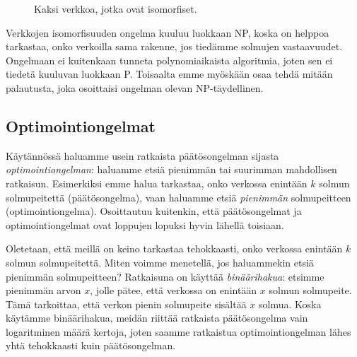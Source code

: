 \begin{figure}
\center
\begin{center}
\end{center}
\caption{Kaksi verkkoa, jotka ovat isomorfiset.}
\label{fig:veriso}
\end{figure}


Verkkojen isomorfisuuden ongelma kuuluu luokkaan NP,
koska on helppoa tarkastaa, onko verkoilla sama rakenne,
jos tiedämme solmujen vastaavuudet.
Ongelmaan ei kuitenkaan tunneta polynomiaikaista algoritmia,
joten sen ei tiedetä kuuluvan luokkaan P.
Toisaalta emme myöskään osaa tehdä mitään palautusta,
joka osoittaisi ongelman olevan NP-täydellinen.

\subsection{Optimointiongelmat}

Käytännössä haluamme usein ratkaista päätösongelman
sijasta \emph{optimointiongelman}: haluamme etsiä pienimmän
tai suurimman mahdollisen ratkaisun.
Esimerkiksi emme halua tarkastaa, onko verkossa
enintään $k$ solmun solmupeitettä (päätösongelma),
vaan haluamme etsiä \emph{pienimmän} solmupeitteen (optimointiongelma).
Osoittautuu kuitenkin, että päätösongelmat ja optimointiongelmat
ovat loppujen lopuksi hyvin lähellä toisiaan.

Oletetaan, että meillä on keino tarkastaa tehokkaasti,
onko verkossa enin\-tään $k$ solmun solmupeitettä.
Miten voimme menetellä, jos haluammekin etsiä pienimmän
solmupeitteen?
Ratkaisuna on käyttää \emph{binäärihakua}:
etsimme pienimmän arvon $x$, jolle pätee,
että verkossa on enintään $x$ solmun solmupeite.
Tämä tarkoittaa, että verkon pienin solmupeite
sisältää $x$ solmua.
Koska käytämme binäärihakua, meidän riittää ratkaista
päätösongelma vain logaritminen määrä kertoja,
joten saamme ratkaistua optimointiongelman lähes yhtä
tehokkaasti kuin päätösongelman.

